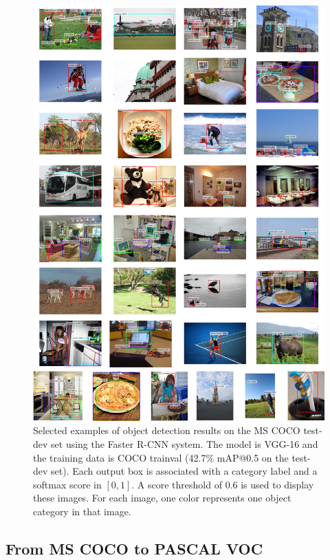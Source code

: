 \documentclass[10pt,journal,cspaper,compsoc]{IEEEtran}
\begin{document}
\begin{figure}[t]
\centering
\includegraphics[width=0.72\linewidth]{eps/coco_results}
\caption{Selected examples of object detection results on the MS COCO test-dev set using the Faster R-CNN system. The model is VGG-16 and the training data is COCO trainval (42.7\% mAP@0.5 on the test-dev set). Each output box is associated with a category label and a softmax score in $[0,1]$. A score threshold of 0.6 is used to display these images. For each image, one color represents one object category in that image.}
\label{fig:coco_results}
\end{figure}

\subsection{From MS COCO to PASCAL VOC}
\end{document}
